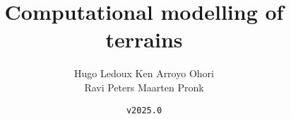 \documentclass[
  fontsize=10pt, %
  twoside=true, %
  secnumdepth=1, %
  numbers=noenddot, %
]{kaobook}
\begin{document}


\title{Computational modelling of terrains}
\author{Hugo Ledoux \hspace{10mm} Ken Arroyo Ohori\\ Ravi Peters \hspace{17mm} Maarten Pronk}
\date{\texttt{v2025.0}}



\frontmatter %





\cleardoublepage







\maketitle

\end{document}
